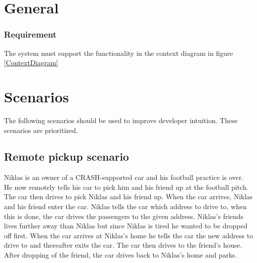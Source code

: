 \documentclass{article}
\begin{document}
\section{General}
\setcounter{subsubsection}{0}
    \subsubsection{Requirement}
\hfill \break 
\- \- \-The system must support the functionality in the context diagram in figure \ref{ContextDiagram}

\section{Scenarios}
\noindent The following scenarios should be used to improve developer intuition. These scenarios are prioritized.

\subsection {Remote pickup scenario}
\noindent Niklas is an owner of a CRASH-supported car and his football practice is over. He now remotely tells his car to pick him and his friend up at the football pitch. The car then drives to pick Niklas and his friend up. When the car arrives, Niklas and his friend enter the car. Niklas tells the car which address to drive to, when this is done, the car drives the passengers to the given address. Niklas's friends lives further away than Niklas but since Niklas is tired he wanted to be dropped off first. When the car arrives at Niklas's home he tells the car the new address to drive to and thereafter exits the car. The car then drives to the friend's house. After dropping of the friend, the car drives back to Niklas's home and parks.
\end{document}
